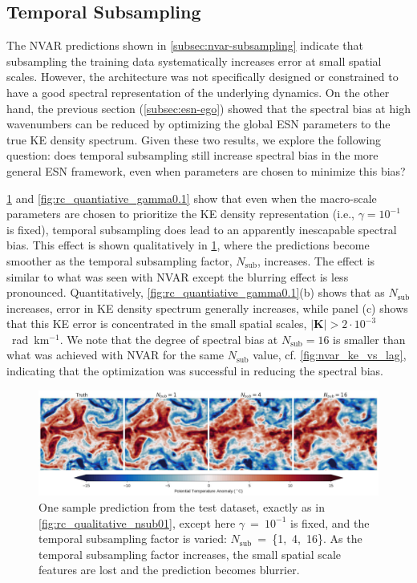 \documentclass[draft]{agujournal2019}
\newcommand{\nsub}{N_\text{sub}}
\begin{document}
\subsection{Temporal Subsampling}
\label{subsec:esn-subsampling}


The NVAR predictions shown in \cref{subsec:nvar-subsampling} indicate that
subsampling the training data systematically increases error at small spatial
scales.
However, the architecture was not specifically designed or constrained to
have a good spectral representation of the underlying dynamics.
On the other hand, the previous section (\cref{subsec:esn-ego})
showed that the spectral bias at high wavenumbers
can be reduced by optimizing the global ESN parameters
to the true KE density spectrum.
Given these two results, we explore the following question: does temporal subsampling still
increase spectral bias in the more general ESN framework, even when parameters
are chosen to minimize this bias?

\cref{fig:rc_qualitative_gamma0.1} and \cref{fig:rc_quantiative_gamma0.1}
show that even when the macro-scale parameters are chosen to prioritize the KE
density representation (i.e., $\gamma = 10^{-1}$ is fixed),
temporal subsampling does lead to an apparently inescapable spectral bias.
This effect is shown qualitatively in \cref{fig:rc_qualitative_gamma0.1},
where the predictions become
smoother as the temporal subsampling factor, $\nsub$, increases.
The effect is similar to what was seen with NVAR except the blurring effect is
less pronounced.
Quantitatively, \cref{fig:rc_quantiative_gamma0.1}(b) shows that as $\nsub$
increases, error in KE density spectrum generally increases, while panel (c) shows that this KE
error is concentrated in the small spatial scales,
$|\mathbf{K}| > 2\cdot10^{-3}$~rad~km$^{-1}$.
We note that the degree of spectral bias at $\nsub=16$ is smaller than what was
achieved with NVAR for the same $\nsub$ value, cf. \cref{fig:nvar_ke_vs_lag},
indicating that the optimization was successful in reducing the spectral bias.

\begin{figure}
    \centering
    \includegraphics[width=\textwidth]{rc_qualitative_nsub.jpg}
    \caption{One sample prediction from the test dataset, exactly as in
        \cref{fig:rc_qualitative_nsub01}, except here $\gamma$~=~$10^{-1}$ is fixed, and
        the temporal subsampling factor is varied: $\nsub$~=~\{1,~4,~16\}.
        As the temporal subsampling factor increases, the small spatial scale
        features are lost and the prediction becomes blurrier.
    }
    \label{fig:rc_qualitative_gamma0.1}
\end{figure}
\end{document}
